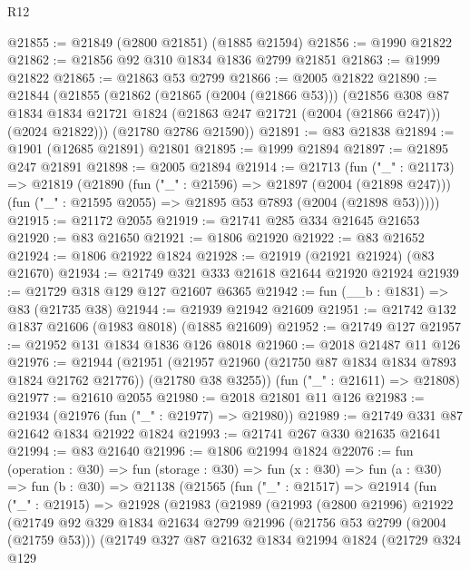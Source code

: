 \begin{lexlean}{R12}
\begin{coremodule}
@21855 := @21849 (@2800 @21851) (@1885 @21594)
@21856 := @1990 @21822
@21862 := @21856 @92 @310 @1834 @1836 @2799 @21851
@21863 := @1999 @21822
@21865 := @21863 @53 @2799
@21866 := @2005 @21822
@21890 := @21844
    (@21855
      (@21862
        (@21865 (@2004 (@21866 @53)))
        (@21856
          @308
          @87
          @1834
          @1834
          @21721
          @1824
          (@21863 @247 @21721 (@2004 (@21866 @247)))
          (@2024 @21822)))
      (@21780 @2786 @21590))
@21891 := @83 @21838
@21894 := @1901 (@12685 @21891) @21801
@21895 := @1999 @21894
@21897 := @21895 @247 @21891
@21898 := @2005 @21894
@21914 := @21713
    (fun ("_" : @21173) =>
    @21819
      (@21890
        (fun ("_" : @21596) => @21897 (@2004 (@21898 @247)))
        (fun ("_" : @21595 @2055) => @21895 @53 @7893 (@2004 (@21898 @53)))))
@21915 := @21172 @2055
@21919 := @21741 @285 @334 @21645 @21653
@21920 := @83 @21650
@21921 := @1806 @21920
@21922 := @83 @21652
@21924 := @1806 @21922 @1824
@21928 := @21919 (@21921 @21924) (@83 @21670)
@21934 := @21749 @321 @333 @21618 @21644 @21920 @21924
@21939 := @21729 @318 @129 @127 @21607 @6365
@21942 := fun (__b : @1831) => @83 (@21735 @38)
@21944 := @21939 @21942 @21609
@21951 := @21742 @132 @1837 @21606 (@1983 @8018) (@1885 @21609)
@21952 := @21749 @127
@21957 := @21952 @131 @1834 @1836 @126 @8018
@21960 := @2018 @21487 @11 @126
@21976 := @21944
    (@21951 (@21957 @21960 (@21750 @87 @1834 @1834 @7893 @1824 @21762 @21776)) (@21780 @38 @3255))
    (fun ("_" : @21611) => @21808)
@21977 := @21610 @2055
@21980 := @2018 @21801 @11 @126
@21983 := @21934 (@21976 (fun ("_" : @21977) => @21980))
@21989 := @21749 @331 @87 @21642 @1834 @21922 @1824
@21993 := @21741 @267 @330 @21635 @21641
@21994 := @83 @21640
@21996 := @1806 @21994 @1824
@22076 := fun (operation : @30) =>
  fun (storage : @30) =>
  fun (x : @30) =>
  fun (a : @30) =>
  fun (b : @30) =>
  @21138
    (@21565
      (fun ("_" : @21517) =>
      @21914
        (fun ("_" : @21915) =>
        @21928
          (@21983
            (@21989
              (@21993
                (@2800 @21996)
                @21922
                (@21749
                  @92
                  @329
                  @1834
                  @21634
                  @2799
                  @21996
                  (@21756 @53 @2799 (@2004 (@21759 @53)))
                  (@21749
                    @327
                    @87
                    @21632
                    @1834
                    @21994
                    @1824
                    (@21729
                      @324
                      @129

\end{coremodule}
\end{lexlean}
